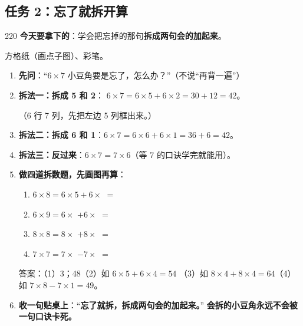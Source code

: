 \subsection{任务 2：忘了就拆开算}

\begin{lesson}{2}{20}
\textbf{今天要拿下的}：学会把忘掉的那句\textbf{拆成两句会的加起来}。

\begin{materials}
方格纸（画点子图）、彩笔。
\end{materials}

\begin{enumerate}
  \item \textbf{先问}：“$6\times7$ 小豆角要是忘了，怎么办？”（不说“再背一遍”）
  \item \textbf{拆法一：拆成 5 和 2}：
        $6\times7 = 6\times5 + 6\times2 = 30+12 = 42$。
        \begin{center}
        \end{center}
        （6 行 7 列，先把左边 5 列框出来。）
  \item \textbf{拆法二：拆成 6 和 1}：$6\times7 = 6\times6 + 6\times1 = 36+6=42$。
  \item \textbf{拆法三：反过来}：$6\times7 = 7\times6$（等 7 的口诀学完就能用）。
  \item \textbf{做四道拆数题，先画图再算}：
        \begin{enumerate}[label=（\arabic*）,itemsep=2pt]
          \item $6\times8 = 6\times5 + 6\times$ \blank[1cm] $=$ \blank[1.4cm]
          \item $6\times9 = 6\times$ \blank[1cm] $+ 6\times$ \blank[1cm] $=$ \blank[1.4cm]
          \item $8\times8 = 8\times$ \blank[1cm] $+ 8\times$ \blank[1cm] $=$ \blank[1.4cm]
          \item $7\times7 = 7\times$ \blank[1cm] $- 7\times$ \blank[1cm] $=$ \blank[1.4cm]
        \end{enumerate}
        答案：（1）3；48\quad（2）如 $6\times5+6\times4=54$\quad
        （3）如 $8\times4+8\times4=64$\quad（4）如 $7\times8-7\times1=49$。
  \item \textbf{收一句贴桌上}：“\textbf{忘了就拆，拆成两句会的加起来。}”
        \textbf{会拆的小豆角永远不会被一句口诀卡死。}
\end{enumerate}


\end{lesson}
